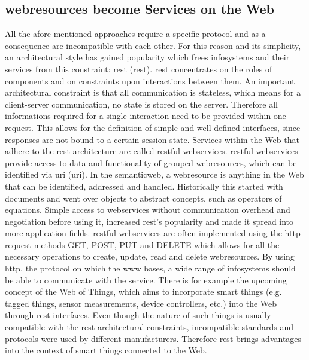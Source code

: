 \subsection{\glspl{webresource} become Services on the Web}
All the afore mentioned approaches require a specific protocol and as a consequence are incompatible with each other.
For this reason and its simplicity, an architectural style has gained popularity which frees \textrm{\glspl{infosystem}} and their services from this constraint: \textrm{\acrlong{rest} (\acrshort{rest})}\cite{fielding2000architectural}.
\textrm{\acrshort{rest}} concentrates on the roles of components and on constraints upon interactions between them.
An important architectural constraint is that all communication is stateless, which means for a client-server communication, no state is stored on the server.
Therefore all informations required for a single interaction need to be provided within one request.
This allows for the definition of simple and well-defined interfaces, since responses are not bound to a certain session state. 
Services within the Web that adhere to the \textrm{\acrshort{rest}} architecture are called \textrm{\acrshort{rest}ful \glspl{webservice}}.
\textrm{\acrshort{rest}ful \glspl{webservice}} provide access to data and functionality of grouped \textrm{\glspl{webresource}}, which can be identified via \textrm{\acrlong{uri} (\acrshort{uri})}\cite{masinter2005uniform}.
In the \textrm{\gls{semanticweb}}\cite{berners2001semantic}, a \textrm{\gls{webresource}} is anything in the Web that can be identified, addressed and handled.
Historically this started with documents and went over objects to abstract concepts, such as operators of equations.
Simple access to \textrm{\glspl{webservice}} without communication overhead and negotiation before using it, increased \textrm{\acrshort{rest}}'s popularity and made it spread into more application fields.
\textrm{\acrshort{rest}ful \glspl{webservice}} are often implemented using the \textrm{\acrshort{http}} request methods \textrm{GET}, \textrm{POST}, \textrm{PUT} and \textrm{DELETE} which allows for all the necessary operations to create, update, read and delete \textrm{\glspl{webresource}}.
By using \textrm{\acrshort{http}}, the protocol on which the \textrm{\gls{www}} bases, a wide range of \textrm{\glspl{infosystem}} should be able to communicate with the service.
There is for example the upcoming concept of the \textrm{Web of Things}\cite{5678452}, which aims to incorporate smart things (e.g. tagged things, sensor measurements, device controllers, etc.) into the Web through \textrm{\acrshort{rest}} interfaces.
Even though the nature of such things is usually compatible with the \textrm{\acrshort{rest}} architectural constraints, incompatible standards and protocols were used by different manufacturers.
Therefore \textrm{\acrshort{rest}} brings advantages into the context of smart things connected to the Web.

